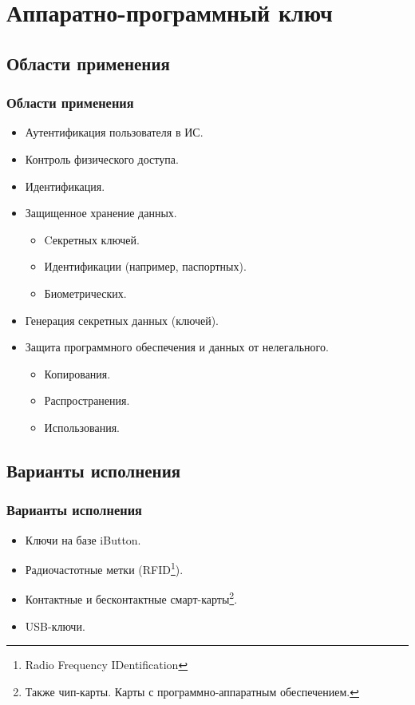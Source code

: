 \section{Аппаратно-программный ключ}


\subsection{Области применения}


\begin{frame}
\frametitle{Области применения}
\begin{itemize}
    \item Аутентификация пользователя в ИС.
    
    \item Контроль физического доступа.
    
    \item Идентификация.
    
    \item Защищенное хранение данных.
    \begin{itemize}
        \item Cекретных ключей.
        \item Идентификации (например, паспортных).
        \item Биометрических.
    \end{itemize}
    
    \item Генерация секретных данных (ключей).
    
    \item Защита программного обеспечения и данных от нелегального.
    \begin{itemize}
        \item Копирования.
        \item Распространения.
        \item Использования.
    \end{itemize}
\end{itemize}
\end{frame}


\subsection{Варианты исполнения}


\begin{frame}
\frametitle{Варианты исполнения}
\begin{itemize}
    \item Ключи на базе iButton.
    
    \item Радиочастотные метки (RFID\footnote{Radio Frequency IDentification}).
    
    \item Контактные и бесконтактные смарт-карты\footnote{Также чип-карты. Карты с программно-аппаратным обеспечением.}.
    
    \item USB-ключи.
\end{itemize}
\end{frame}


